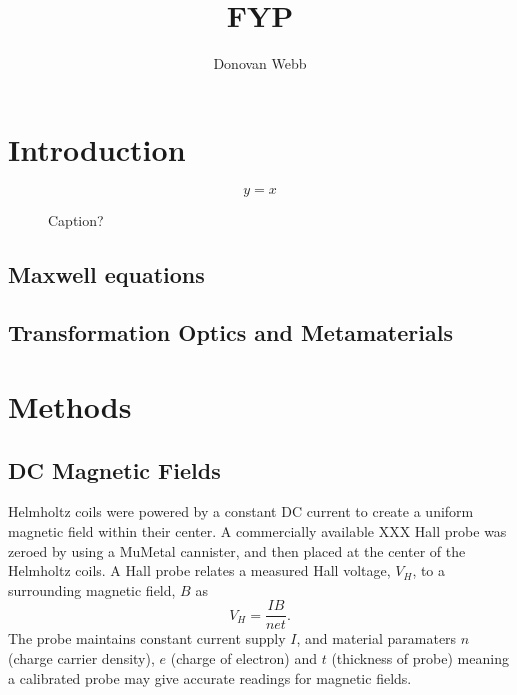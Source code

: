 \documentclass[11pt]{iopart}
\begin{document}
\title[]{FYP}

\author{Donovan Webb}

\address{Department of Physics,
University of Bath, Bath BA2 7AY, United Kingdom}

\begin{abstract}
\end{abstract}

\section{Introduction}

\begin{equation}
  y=x
  \end{equation}

\begin{figure}
  \caption{Caption?}
  \end{figure}

\subsection{Maxwell equations}
\subsection{Transformation Optics and Metamaterials}

\section{Methods}
\subsection{DC Magnetic Fields}
Helmholtz coils were powered by a constant DC current to create a
uniform magnetic field within their center. A commercially available
XXX Hall probe was zeroed by using a MuMetal cannister, and then
placed at the center of the Helmholtz coils.  A Hall probe relates a
measured Hall voltage, $V_H$, to a surrounding magnetic field, $B$
\cite{XXX} as
\begin{equation}
  V_H = \frac{IB}{net}.
\end{equation}
The probe maintains constant current supply $I$, and material
paramaters $n$ (charge carrier density), $e$ (charge of electron) and
$t$ (thickness of probe) meaning a calibrated probe may give accurate
readings for magnetic fields.\\
\end{document}
